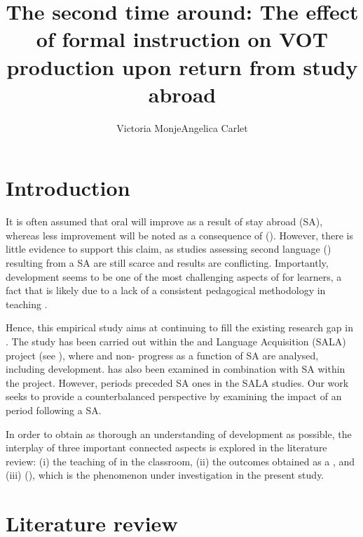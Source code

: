 \documentclass[output=paper]{langsci/langscibook}
\author{Victoria Monje\affiliation{Universitat Pompeu Fabra}\lastand Angelica Carlet\affiliation{Universitat Internacional de Catalunya}}
\title{The second time around: The effect of formal instruction on VOT production upon return from study abroad}
\begin{document}
\section{Introduction}


It is often assumed that  oral  will improve as a result of stay abroad (SA), whereas less improvement will be noted as a consequence of  (). However, there is little evidence to support this claim, as studies assessing second language ()   resulting from a SA are still scarce and results are conflicting. Importantly,  development seems to be one of the most challenging aspects of   for learners, a fact that is likely due to a lack of a consistent pedagogical methodology in teaching \citep{DarcyEtAl2012}. 



Hence, this empirical study aims at continuing to fill the existing research gap in  . The study has been carried out within the  and Language Acquisition (SALA) project (see \citealt{Pérez-Vidal2014}), where  and non- progress as a function of SA are analysed, including   development.  has also been examined in combination with SA within the project. However,  periods preceded SA ones in the SALA studies. Our work seeks to provide a counterbalanced perspective by examining the impact of an  period following a SA.



In order to obtain as thorough an understanding of   development as possible, the interplay of three important connected aspects is explored in the literature review: (i) the teaching of  in the classroom, (ii) the  outcomes obtained as a , and (iii)  (), which is the phenomenon under investigation in the present study. 



\section{Literature review} 
\end{document}
